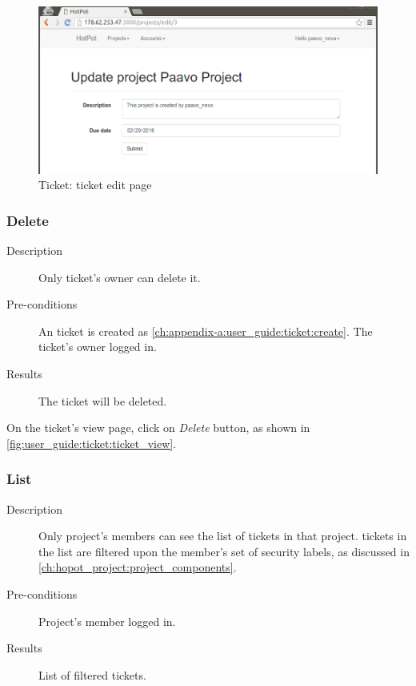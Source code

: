 \begin{figure}[bth]
\myfloatalign
\includegraphics[width=1.0\linewidth]{gfx/chapter_5/ticket/ticket_edit}
\caption[Ticket: ticket view page]{Ticket: ticket edit page}
\label{fig:user_guide:ticket:ticket_edit}
\end{figure}

\subsubsection{Delete}
\label{ch:appendix-a:user_guide:ticket:delete}

\begin{description}
\item[Description] Only ticket's owner can delete it.
\item[Pre-conditions] An ticket is created as \autoref{ch:appendix-a:user_guide:ticket:create}.
The ticket's owner logged in.
\item[Results] The ticket will be deleted.
\end{description}

On the ticket's view page, click on \emph{Delete} button, as shown in \autoref{fig:user_guide:ticket:ticket_view}.

\subsubsection{List}
\label{ch:appendix-a:user_guide:ticket:list}

\begin{description}
\item[Description] Only project's members can see the list of tickets in that project.
tickets in the list are filtered upon the member's set of security labels, as discussed in \autoref{ch:hopot_project:project_components}.
\item[Pre-conditions] Project's member logged in.
\item[Results] List of filtered tickets.
\end{description}

